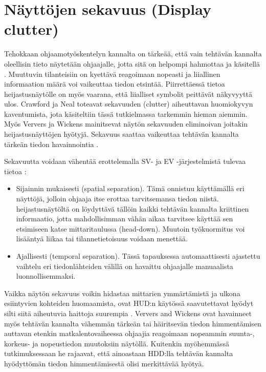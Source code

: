 \documentclass[utf8,bachelor,manualbib]{gradu3}
\begin{document}
\section{Näyttöjen sekavuus (Display clutter)}

Tehokkaan ohjaamotyöskentelyn kannalta on tärkeää, että vain tehtävän kannalta oleellisin tieto näytetään ohjaajalle, jotta sitä on helpompi hahmottaa ja käsitellä \citep{ververswickens1998}. Muuttuvin tilanteisiin on kyettävä reagoimaan nopeasti ja liiallinen informaation määrä voi vaikeuttaa tiedon etsintää. Piirrettäessä tietoa heijastusnäytölle on myös vaarana, että liialliset symbolit peittävät näkyvyyttä ulos. Crawford ja Neal \citeyearpar{crawfordneal2006} toteavat sekavuuden (clutter) aiheuttavan huomiokyvyn kaventumista, jota käsiteltiin tässä tutkielmassa tarkemmin hieman aiemmin. Myös Ververs ja Wickens \citeyearpar{ververswickens1996} mainitsevat näytön sekavuuden eliminoivan joitakin heijastusnäyttöjen hyötyjä. Sekavuus saattaa vaikeuttaa tehtävän kannalta tärkeän tiedon havainnointia \citep{nikolicym2004, stelzerwickens2006, wickensym2003}.

Sekavuutta voidaan vähentää erottelemalla SV- ja EV -järjestelmistä tulevaa tietoa \citep{baileyym2007}:

\begin{itemize}
\item Sijainnin mukaisesti (spatial separation).
Tämä onnistuu käyttämällä eri näyttöjä, jolloin ohjaaja itse erottaa tarvitsemansa tiedon niistä. heijastusnäytöltä on löydyttävä tällöin kaikki tehtävän kannalta kriittinen informaatio, jotta mahdollisimman vähän aikaa  tarvitsee käyttää sen etsimiseen katse mittaritaulussa (head-down). Muutoin työkuormitus voi lisääntyä liikaa tai tilannetietoisuus voidaan menettää.
\item Ajallisesti (temporal separation).
Tässä tapauksessa automaattisesti ajastettu vaihtelu eri tiedonlähteiden välillä on havaittu ohjaajalle manuaalista luonnollisemmaksi.
\end{itemize}

Vaikka näytön sekavuus voikin hidastaa mittarien ymmärtämistä ja ulkona esiintyvien kohteiden huomaamista, ovat HUD:n käytössä saavutettavat hyödyt silti siitä aiheutuvia haittoja suurempia \citep{ververswickens1998}. Ververs and Wickens \citeyearpar{ververswickens1996} ovat havainneet myös tehtävän kannalta vähemmän tärkeän tai häiritsevän tiedon himmentämisen auttavan etenkin matkalentovaiheessa ohjaajia reagoimaan nopeammin suunta-, korkeus- ja nopeustiedon muutoksiin näytöllä. Kuitenkin myöhemmässä tutkimuksessaan \citeyearpar{ververswickens1998} he rajaavat, että ainoastaan HDD:lla tehtävän kannalta hyödyttömän tiedon himmentämisestä olisi merkittävää hyötyä.
\end{document}
